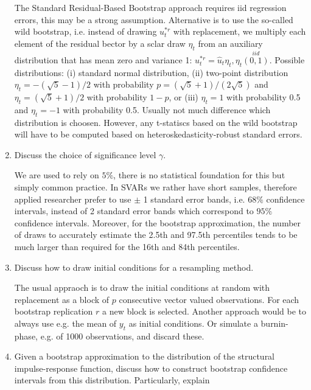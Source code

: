 \documentclass[a4paper]{scrartcl}
\begin{document}
\begin{enumerate}
\begin{solution}
                  The Standard Residual-Based Bootstrap approach requires iid regression errors, this may be a strong assumption. Alternative is to use the so-called wild bootstrap, i.e. instead of drawing $u_t^{\ast r}$ with replacement, we multiply each element of the residual bector by a sclar draw $\eta_t$ from an auxiliary distribution that has mean zero and variance 1: $u_t^{\ast r} = \hat{u}_t \eta_t, \eta_t \overset{iid}{(0,1)}$. Possible distributions: (i) standard normal distribution, (ii) two-point distribution $\eta_t = -(\sqrt{5}-1)/2$ with probability $p=(\sqrt{5}+1)/(2 \sqrt{5})$ and  $\eta_t = (\sqrt{5}+1)/2$ with probability $1-p$, or (iii) $\eta_t =1$ with probability 0.5 and $\eta_t=-1$ with probability 0.5. Usually not much difference which distribution is choosen. However, any t-statiscs based on the wild bootstrap will have to be computed based on heteroskedasticity-robust standard errors. 
              \end{solution}
        \item Discuss the choice of significance level $\gamma$.
              \begin{solution}
                  We are used to rely on $5\%$, there is no statistical foundation for this but simply common practice. In SVARs we rather have short samples, therefore applied researcher prefer to use $\pm$ 1 standard error bands, i.e. $68\%$ confidence intervals, instead of 2 standard error bands which correspond to $95\%$ confidence intervals. Moreover, for the bootstrap approximation, the number of draws to accurately estimate the 2.5th and 97.5th percentiles tends to be much larger than required for the 16th and 84th percentiles.
              \end{solution}
        \item Discuss how to draw initial conditions for a resampling method.
              \begin{solution}
                  The usual appraoch is to draw the initial conditions at random with replacement as a block of $p$ consecutive vector valued observations. For each bootstrap replication $r$ a new block is selected. Another approach would be to always use e.g. the mean of $y_t$ as initial conditions. Or simulate a burnin-phase, e.g. of 1000 observations, and discard these.
              \end{solution}
        \item Given a bootstrap approximation to the distribution of the structural impulse-response function, discuss how to construct bootstrap confidence intervals from this distribution. Particularly, explain

\end{enumerate}
\end{document}
